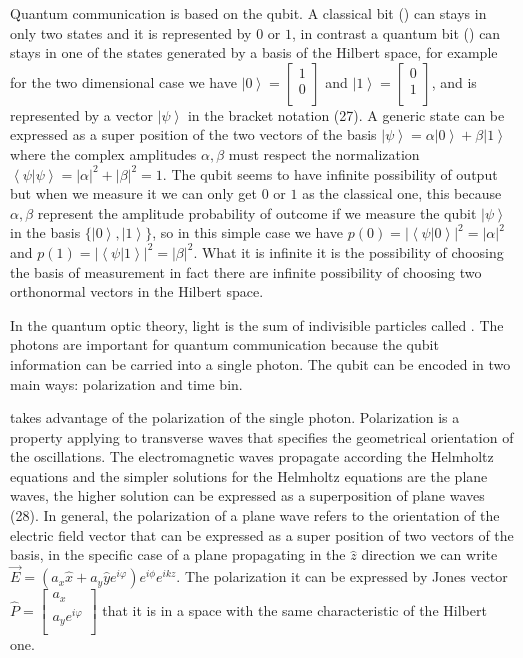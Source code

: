 Quantum communication is based on the qubit. A classical bit () can stays in only two states and it is represented by $0$ or $1$, in contrast a quantum bit () can stays in one of the states generated by  a basis of the Hilbert space, for example for the two dimensional case we have $\left|0\right> = \begin{bmatrix} 1 \\ 0 \\ \end{bmatrix}$ and $\left|1\right> = \begin{bmatrix} 0 \\ 1 \\ \end{bmatrix}$, and is represented by a vector $\left|\psi\right>$ in the bracket notation (27). A generic state can be expressed as a super position of the two vectors of the basis $\left|\psi\right> = \alpha\left|0\right> + \beta\left|1\right>$ where the complex amplitudes $\alpha, \beta$ must respect the normalization $\left<\psi|\psi\right> = |\alpha|^2 + |\beta|^2 = 1$. The qubit seems to have infinite possibility of output but when we measure it we can only get $0$ or $1$ as the classical one, this because $\alpha, \beta$ represent the amplitude probability of outcome if we measure the qubit $\left|\psi\right>$ in the basis $\{\left|0\right>, \left|1\right>\}$, so in this simple case we have $p(0) = |\left<\psi|0\right>|^2 = |\alpha|^2$ and $p(1) = |\left<\psi|1\right>|^2 = |\beta|^2$. What it is infinite it is the possibility of choosing the basis of measurement in fact there are infinite possibility of choosing two orthonormal vectors in the Hilbert space.

In the quantum optic theory, light is the sum of indivisible particles called . The photons are important for quantum communication because the qubit information can be carried into a single photon. The qubit can be encoded in two main ways: polarization and time bin.

 takes advantage of the polarization of the single photon. Polarization is a property applying to transverse waves that specifies the geometrical orientation of the oscillations. The electromagnetic waves propagate according the Helmholtz equations and the simpler solutions for the Helmholtz equations are the plane waves, the higher solution can be expressed as a superposition of plane waves (28). In general, the polarization of a plane wave refers to the orientation of the electric field vector that can be expressed as a super position of two vectors of the basis, in the specific case of a plane propagating in the $\hat{z}$ direction we can write $\vec{E} = (a_x \hat{x} + a_y \hat{y} e^{i \varphi}) e^{i \phi} e^{i k z}$. The polarization it can be expressed by Jones vector $\hat{P} = \begin{bmatrix} a_x \\ a_y e^{i\varphi} \\ \end{bmatrix}$ that it is in a space with the same characteristic of the Hilbert one.

